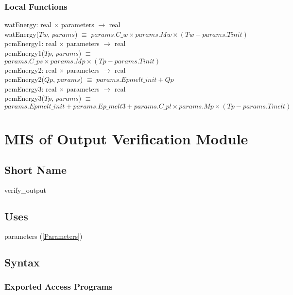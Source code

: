 \documentclass[12pt]{article}
\begin{document}
\subsubsection{Local Functions}

watEnergy: real $\times$ parameters $\rightarrow$ real \\
watEnergy($Tw$, $params$) $\equiv$ $params.C\_w \times params.Mw \times (Tw - params.Tinit)$ \\
\newline
pcmEnergy1: real $\times$ parameters $\rightarrow$ real \\
pcmEnergy1($Tp$, $params$) $\equiv$ $params.C\_ps \times params.Mp \times (Tp - params.Tinit)$ \\
\newline
pcmEnergy2: real $\times$ parameters $\rightarrow$ real \\
pcmEnergy2($Qp$, $params$) $\equiv$ $params.Epmelt\_init + Qp$ \\
\newline
pcmEnergy3: real $\times$ parameters $\rightarrow$ real \\
pcmEnergy3($Tp$, $params$) $\equiv$ $params.Epmelt\_init + params.Ep\_melt3 + params.C\_pl \times params.Mp \times (Tp - params.Tmelt)$ \\

\section{MIS of Output Verification Module} \label{VerifyOutput}

\subsection{Short Name}

verify\_output

\subsection{Uses}

parameters (\ref{Parameters})

\subsection{Syntax}

\subsubsection{Exported Access Programs}
\end{document}
